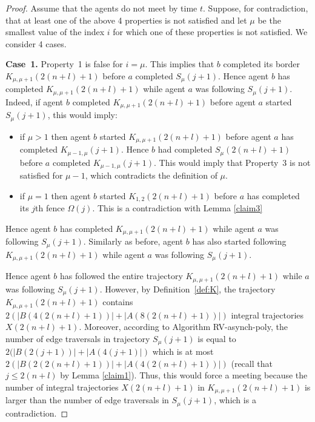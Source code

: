 \documentclass [11pt] {article}
\begin{document}
\begin{proof}
{Assume that the agents do not meet by time $t$.}
Suppose, for contradiction, that at least one of the above 4 properties is not satisfied and let $\mu$ be the smallest value of the index $i$ for which one of these properties is not satisfied. We consider 4 cases.

{\bf Case~1.} Property~1 is false for $i=\mu$. This implies that $b$ completed its border $K_{{\mu,\mu+1}}(2(n+l)+1)$ before $a$ completed $S_{\mu}(j+1)$. Hence agent $b$ has completed $K_{{\mu,\mu+1}}(2(n+l)+1)$ while agent $a$ was following 
$S_{\mu}(j+1)$. Indeed, if agent $b$ completed $K_{{\mu,\mu+1}}(2(n+l)+1)$ before agent $a$ started $S_{\mu}(j+1)$, this would imply:
\begin{itemize}

\item if $\mu>1$ then agent $b$ started $K_{{\mu,\mu+1}}(2(n+l)+1)$ before agent $a$ has completed $K_{{\mu-1,\mu}}(j+1)$. Hence $b$ had completed $S_{\mu}(2(n+l)+1)$ before $a$ completed $K_{{\mu-1,\mu}}(j+1)$. This would imply that Property~3 is not satisfied for $\mu-1$, which contradicts the definition of $\mu$. 

\item if $\mu=1$ then agent $b$ started $K_{{1,2}}(2(n+l)+1)$ before $a$ has completed its $j$th fence $\Omega(j)$. {This is a contradiction with Lemma \ref{claim3}}



\end{itemize}

Hence agent $b$ has completed $K_{{\mu,\mu+1}}(2(n+l)+1)$ while agent $a$ was following 
$S_{\mu}(j+1)$. Similarly as before, agent $b$ has also started following $K_{{\mu,\mu+1}}(2(n+l)+1)$ while agent $a$ was following $S_{\mu}(j+1)$. 

Hence agent $b$ has followed the entire trajectory $K_{{\mu,\mu+1}}(2(n+l)+1)$ while $a$ was following $S_{\mu}(j+1)$. 
However, by Definition~\ref{def:K}, the trajectory $K_{{\mu,\mu+1}}(2(n+l)+1)$ contains $2(|B(4(2(n+l)+1))|+|A(8(2(n+l)+1))|)$ integral trajectories $X(2(n+l)+1)$. Moreover, according to Algorithm RV-asynch-poly, the number of {edge traversals} in trajectory $S_{\mu}(j+1)$ is equal to $2(|B(2(j+1))|+|A(4(j+1)|)$ which is at most $2(|B(2(2(n+l)+1))|+|A(4(2(n+l)+1))|)$ (recall that $j\leq 2(n+l)$ by Lemma \ref{claim1}). Thus, this would force a meeting because the number of integral trajectories $X(2(n+l)+1)$ in $K_{{\mu,\mu+1}}(2(n+l)+1)$ is larger than the number of {edge traversals} in $S_{\mu}(j+1)$, which is a contradiction.  




\end{proof}
\end{document}
